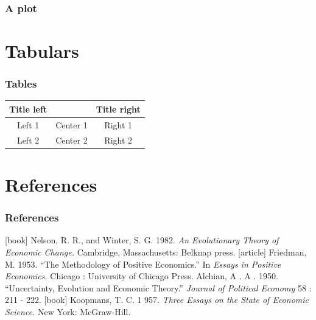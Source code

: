 \documentclass{beamer} 	%
\begin{document}
\begin{frame}[fragile]
\frametitle{A plot}
	\begin{center}
		
	\end{center}
\end{frame}


\section{Tabulars}
\begin{frame}
    \frametitle{Tables}
    \begin{center}
		\begin{tabular}{ccc}
		\toprule
  	    	Title left & & Title right  \\
		 	\midrule  \pause
  	        Left 1 & Center 1 & Right 1  \\ 
			Left 2 & Center 2 & Right 2   \\
			\bottomrule
		\end{tabular}
	\end{center}
\end{frame}


\section{References}
\begin{frame}
\frametitle{References}
\begin{thebibliography}{9}
[book]
 Nelson, R. R., and Winter, S. G. 1982. \emph{An Evolutionary Theory of Economic Change.} Cambridge, Massachusetts: Belknap press.
[article]
 Friedman, M. 1953. ``The Methodology of Positive Economics.''  In \emph{Essays in
Positive Economics.} Chicago : University of Chicago Press.
 Alchian, A . A . 1950. ``Uncertainty, Evolution and Economic Theory.'' \emph{Journal
of Political Economy} 58 : 211 - 222.
[book]
 Koopmans, T. C. 1 957. \emph{Three Essays on the State of Economic Science.} New
York: McGraw-Hill.
\end{thebibliography}
\end{frame}

\appendix
\end{document}
